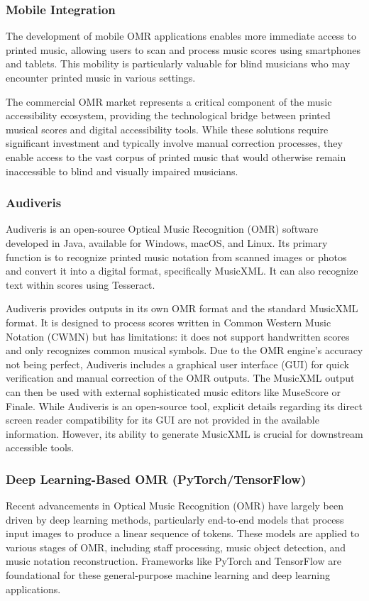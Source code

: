 \subsubsection{Mobile Integration}
The development of mobile OMR applications enables more immediate access to printed music, allowing users to scan and process music scores using smartphones and tablets. This mobility is particularly valuable for blind musicians who may encounter printed music in various settings.

The commercial OMR market represents a critical component of the music accessibility ecosystem, providing the technological bridge between printed musical scores and digital accessibility tools. While these solutions require significant investment and typically involve manual correction processes, they enable access to the vast corpus of printed music that would otherwise remain inaccessible to blind and visually impaired musicians.
\subsubsection{Audiveris}
Audiveris is an open-source Optical Music Recognition (OMR) software developed in Java, available for Windows, macOS, and Linux. \cite{audiveris-org,audiveris-github} Its primary function is to recognize printed music notation from scanned images or photos and convert it into a digital format, specifically MusicXML. \cite{audiveris-org} It can also recognize text within scores using Tesseract. \cite{audiveris-org}

Audiveris provides outputs in its own OMR format and the standard MusicXML format. \cite{audiveris-org} It is designed to process scores written in Common Western Music Notation (CWMN) but has limitations: it does not support handwritten scores and only recognizes common musical symbols. \cite{audiveris-org} Due to the OMR engine's accuracy not being perfect, Audiveris includes a graphical user interface (GUI) for quick verification and manual correction of the OMR outputs. \cite{audiveris-org} The MusicXML output can then be used with external sophisticated music editors like MuseScore or Finale. \cite{audiveris-org} While Audiveris is an open-source tool, explicit details regarding its direct screen reader compatibility for its GUI are not provided in the available information. However, its ability to generate MusicXML is crucial for downstream accessible tools.

\subsubsection{Deep Learning-Based OMR (PyTorch/TensorFlow)}
Recent advancements in Optical Music Recognition (OMR) have largely been driven by deep learning methods, particularly end-to-end models that process input images to produce a linear sequence of tokens. \cite{researchgate-polyphonic-omr, researchgate-linearized-musicxml} These models are applied to various stages of OMR, including staff processing, music object detection, and music notation reconstruction. \cite{researchgate-polyphonic-omr} Frameworks like PyTorch and TensorFlow are foundational for these general-purpose machine learning and deep learning applications. \cite{pytorch, tensorflow}

